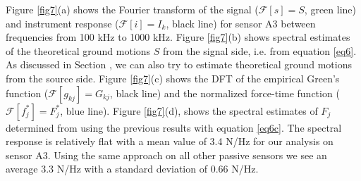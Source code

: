 \documentclass[preprint,3p, 11pt,authoryear]{elsarticle}
\begin{document}
{Figure \ref{fig7}(a) shows the Fourier transform of the signal ($\mathcal{F}[s] = S$, green line) and instrument response ($\mathcal{F}[i] = I_{k}$, black line) for sensor A3 between frequencies from 100 kHz to 1000 kHz. Figure \ref{fig7}(b) shows spectral estimates of the theoretical ground motions $S$ from the signal side, i.e. from equation \eqref{eq6}.  As discussed in Section \label{Spec_deconv}, we can also try to estimate  theoretical ground motions from the source side.  Figure \ref{fig7}(c) shows the DFT of the empirical Green's function ($\mathcal{F}[g_{kj}] = G_{kj}$, black line) and the normalized force-time function ($\mathcal{F}[f^{*}_{j}] = F^{*}_{j}$, blue line). Figure \ref{fig7}(d), shows the spectral estimates of $F_{j}$ determined from using the previous results with equation \eqref{eq6c}.  The spectral response is relatively flat with a mean value of 3.4 N/Hz for our analysis on sensor A3.  Using the same approach on all other passive sensors we see an average 3.3 N/Hz with a standard deviation of 0.66 N/Hz. 


}
\end{document}
